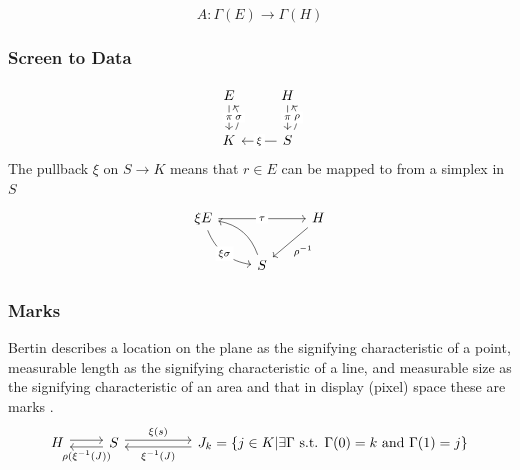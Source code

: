 \documentclass[../main.tex]{subfiles}
\begin{document}
\begin{equation}
    A: \Gamma(E) \rightarrow \Gamma(H)
\end{equation}

\subsubsection{Screen to Data}
\begin{equation}
    \begin{tikzcd}
        E \arrow[d, "\pi" description] & H \arrow[d, "\pi" description]                                                 \\
        K \arrow[u, "\sigma" description, bend right] & S \arrow[l, "\xi" description] \arrow[u, "\rho" description, bend right]
    \end{tikzcd}
\end{equation}
The pullback $\xi$ on $S \rightarrow K$ means that $ r \in E$ can be mapped to from a simplex in $S$
\begin{equation}
    \begin{tikzcd}
        \xi E \arrow[rr, "\tau" description] \arrow[rd, "\xi \sigma" description, bend right] &                          & H \arrow[ld, "\rho^{-1}"] \\
                                                                                              & S \arrow[lu, bend right] &                          
        \end{tikzcd}
\end{equation}

\subsubsection{Marks}
Bertin describes a location on the plane as the signifying characteristic of a point, measurable length as the signifying characteristic of a line, and measurable size as the signifying characteristic of an area and that in display (pixel) space these are marks \cite{bertinIIPropertiesGraphic2011,carpendaleVisualRepresentationSemiology}. 
\begin{equation}
\begin{tikzcd}
    H \arrow[r, shift left] & S \arrow[l, "\rho(\xi^{-1}(J))", shift left] \arrow[rr, "\xi(s)", shift left] &  & J_{k} =  \{j \in K| \exists \Gamma \text{ s.t. } \Gamma(0)=k \text{ and }\Gamma(1)=j\} \arrow[ll, "\xi^{-1}(J)", shift left]
\end{tikzcd}
\label{eq:mark}
\end{equation}
\end{document}
